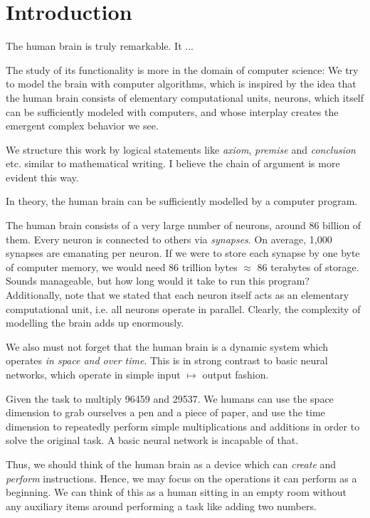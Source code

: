 \documentclass[../../main.tex]{subfiles}
\begin{document}
    \section{Introduction}
    The human brain is truly remarkable. It ...

    The study of its functionality is more in the domain of computer science: We try to model the brain with computer algorithms, which is inspired by the idea that the human brain consists of elementary computational units, neurons, which itself can be sufficiently modeled with computers, and whose interplay creates the emergent complex behavior we see.

    We structure this work by logical statements like \emph{axiom}, \emph{premise} and \emph{conclusion} etc. similar to mathematical writing. I believe the chain of argument is more evident this way.

    \begin{axiom}
        In theory, the human brain can be sufficiently modelled by a computer program.
    \end{axiom}

    The human brain consists of a very large number of neurons, around 86 billion of them. Every neuron is connected to others via \emph{synapses}. On average, 1,000 synapses are emanating per neuron. If we were to store each synapse by one byte of computer memory, we would need 86 trillion bytes $\approx$ 86 terabytes of storage. Sounds manageable, but how long would it take to run this program? Additionally, note that we stated that each neuron itself acts as an elementary computational unit, i.e. all neurons operate in parallel. Clearly, the complexity of modelling the brain adds up enormously.

    We also must not forget that the human brain is a dynamic system which operates \emph{in space and over time}. This is in strong contrast to basic neural networks, which operate in simple input $\mapsto$ output fashion.

    \begin{example}
        Given the task to multiply 96459 and 29537. We humans can use the space dimension to grab ourselves a pen and a piece of paper, and use the time dimension to repeatedly perform simple multiplications and additions in order to solve the original task. A basic neural network is incapable of that.
    \end{example}

    Thus, we should think of the human brain as a device which can \emph{create} and \emph{perform} instructions. Hence, we may focus on the operations it can perform as a beginning. We can think of this as a human sitting in an empty room without any auxiliary items around performing a task like adding two numbers.
\end{document}
